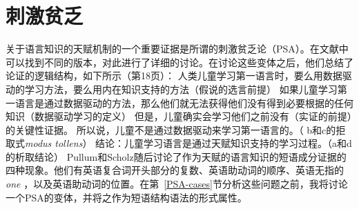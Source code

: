 \section{刺激贫乏}
\label{Abschnitt-PSA}

关于语言知识的天赋机制的一个重要证据是所谓的刺激贫乏论（PSA）\citep[]{Chomsky80b-u}。在文献中可以找到不同的版本，\citet{PS2002a}对此进行了详细的讨论。在讨论这些变体之后，他们总结了论证的逻辑结构，如下所示（第18页）：
\eal
\ex 人类儿童学习第一语言时，要么用数据驱动的学习方法，要么用内在知识支持的方法（假说的选言前提）
\ex 如果儿童学习第一语言是通过数据驱动的方法，那么他们就无法获得他们没有得到必要根据的任何知识（数据驱动学习的定义）
\ex 但是，儿童确实会学习他们之前没有（实证的前提）的关键性证据。
\ex 所以说，儿童不是通过数据驱动来学习第一语言的。（ b和c的拒取式\emph{modus tollens}） 
\ex 结论：儿童学习语言是通过天赋知识支持的学习过程。（a和d的析取结论）
\zl
Pullum和Scholz随后讨论了作为天赋的语言知识的短语成分证据的四种现象。他们有英语复合词开头部分的复数\citep{Gordon86a}、英语助动词的顺序\citep{Kimball73b-u}、英语无指的\emph{one}\citep{Baker78a-u} ，以及英语助动词的位置\citep[--33]{Chomsky71a-u}。在第~\ref{PSA-cases}节分析这些问题之前，我将讨论一个PSA的变体，并将之作为短语结构语法的形式属性。


